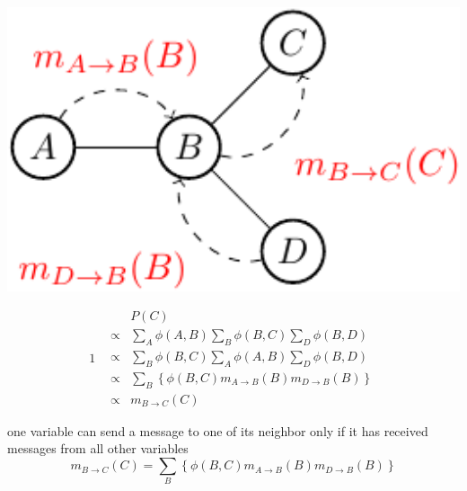 \begin{minipage}[c]{0.4\textwidth}
      \centering
      \includegraphics[width=1.1\textwidth]{./Figures/message_passing_2}
\end{minipage}
\begin{minipage}[c]{0.6\textwidth}
 \begin{equation*}1
  \begin{array}{rcl}
  & & P(C) \\
  &\propto& \sum_{A}\phi(A,B) \sum_B \phi(B,C) \sum_D \phi(B,D)\\ 
  &\propto& \sum_B \phi(B,C)  \sum_{A}\phi(A,B) \sum_D \phi(B,D)\\ 
  &\propto& \sum_{B} \left\{   \phi(B,C) m_{A\rightarrow B}(B) m_{D\rightarrow B}(B) \right\} \\
  &\propto& m_{B\rightarrow C}(C)
  \end{array}
 \end{equation*}
\end{minipage}

  one variable can send a message to one of its neighbor only if it has received messages from all other variables  
  \begin{equation*}
   m_{B\rightarrow C}(C)=\sum_{B} \left\{   \phi(B,C) m_{A\rightarrow B}(B) m_{D\rightarrow B}(B) \right\}
  \end{equation*}


